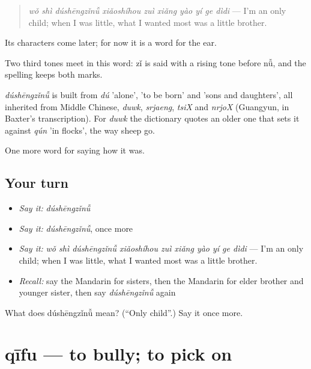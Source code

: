 \begin{quote}
\emph{wǒ shì dúshēngzǐnǚ xiǎoshíhou zuì xiǎng yào yí ge dìdi} — I'm an only child; when I was little, what I wanted most was a little brother.
\end{quote}

Its characters come later; for now it is a word for the ear.

Two third tones meet in this word: zǐ is said with a rising tone before nǚ, and the spelling keeps both marks.

\begin{cousinweb}
\emph{dúshēngzǐnǚ} is built from \emph{dú} 'alone',  'to be born' and  'sons and daughters', all inherited from Middle Chinese, \emph{duwk}, \emph{srjaeng}, \emph{tsiX} and \emph{nrjoX} (Guangyun, in Baxter's transcription). For \emph{duwk} the dictionary quotes an older one that sets it against \emph{qún} 'in flocks', the way sheep go.
\end{cousinweb}

\begin{grammarlens}[title={What you've built}]
One more word for saying how it was.
\end{grammarlens}

\subsection*{Your turn}
\begin{itemize}
\raggedright
  \item \emph{Say it:} \emph{dúshēngzǐnǚ}
  \item \emph{Say it:} \emph{dúshēngzǐnǚ}, once more
  \item \emph{Say it:} \emph{wǒ shì dúshēngzǐnǚ xiǎoshíhou zuì xiǎng yào yí ge dìdi} — I'm an only child; when I was little, what I wanted most was a little brother.
  \item \emph{Recall:} say the Mandarin for sisters, then the Mandarin for elder brother and younger sister, then say \emph{dúshēngzǐnǚ} again
\end{itemize}

\begin{tcolorbox}[breakable,colback=teal!4,colframe=teal!35!black,title={Before you move on}]
What does dúshēngzǐnǚ mean? (\textquotedblleft{}Only child\textquotedblright{}.) Say it once more.
\end{tcolorbox}
\section[qīfu]{qīfu — to bully; to pick on}

